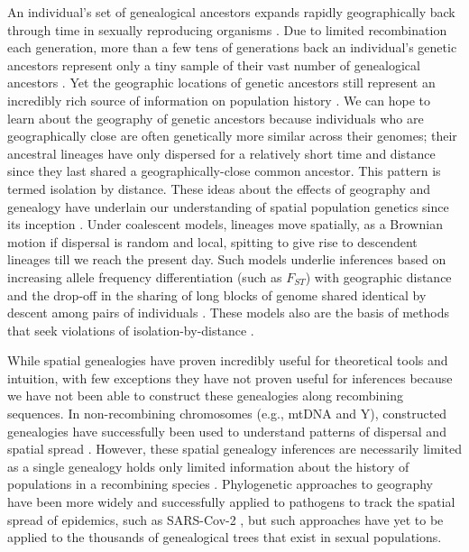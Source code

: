 \documentclass[12pt]{article}
\begin{document}
An individual's set of genealogical ancestors expands rapidly geographically back through time in sexually reproducing organisms \citep{KELLEHER20161,Coop_where_genetic}. 
Due to limited recombination each generation, more than a few tens of generations back an individual's genetic ancestors represent only a tiny sample of their vast number of genealogical ancestors \citep{donnelly1983probability,Coop_many_genetic}. 
Yet the geographic locations of genetic ancestors still represent an incredibly rich source of information on population history \citep{bradburd2019spatial}. We can hope to learn about the geography of genetic ancestors because individuals who are geographically close are often genetically more similar across their genomes; their ancestral lineages have only dispersed for a relatively short time and distance since they last shared a geographically-close common ancestor. 
This pattern is termed isolation by distance. 
These ideas about the effects of geography and genealogy have underlain our understanding of spatial population genetics since its inception  \citep{wright1943isolation,malecot1948mathematics}. 
Under coalescent models, lineages move spatially, as a Brownian motion if dispersal is random and local, spitting to give rise to descendent lineages till we reach the present day. 
Such models underlie inferences based on increasing allele frequency differentiation (such as $F_{ST}$) with geographic distance \citep{rousset1997genetic} and the drop-off in the sharing of long blocks of genome shared identical by descent among pairs of individuals \citep{ralph2013geography,ringbauer2017inferring}. 
These models also are the basis of methods that seek violations of isolation-by-distance \citep{wang2014isolation}.

While spatial genealogies have proven incredibly useful for theoretical tools and intuition, with few exceptions they have not proven useful for inferences because we have not been able to construct these genealogies along recombining sequences.  
In non-recombining chromosomes (e.g., mtDNA and Y), constructed genealogies have successfully been used to understand patterns of dispersal and spatial spread \citep{avise2009phylogeography}.  
However, these spatial genealogy inferences are necessarily limited as a single genealogy holds only limited information about the history of populations in a recombining species \citep{barton1995genealogies}. 
Phylogenetic approaches to geography \citep[`phylogeography';][]{knowles2009statistical} have been more widely and successfully applied to pathogens to track the spatial spread of epidemics, such as SARS-Cov-2 \citep{martin2021insights}, but such approaches have yet to be applied to the thousands of genealogical trees that exist in sexual populations. 
\end{document}
